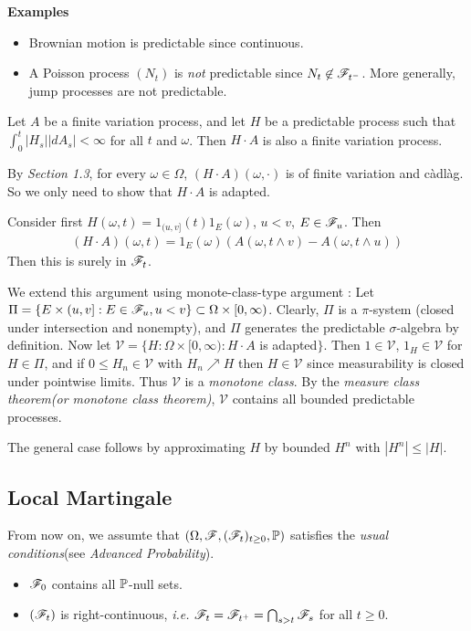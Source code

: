 \documentclass[12pt,a4paper]{article}
\newenvironment{proof}
{\begin{changemargin}{0.5cm}{0.5cm} 
	}%
	{\end{changemargin}
}
\renewenvironment{i}
{\begin{itemize} 
	}%
	{\end{itemize}
}
\newenvironment{p}
{\begin{proof} 
	}%
	{\end{proof}
}
\begin{document}
\textbf{Examples} \begin{i}
\item Brownian motion is predictable since continuous.
\item A Poisson process $(N_t)$ is \emph{not} predictable since $N_t \not\in \mathscr{F}_{t^-}$. More generally, jump processes are not predictable.
\end{i}
\s

\prop Let $A$ be a finite variation process, and let $H$ be a predictable process such that $\int_0^t |H_s| |dA_s| < \infty$ for all $t$ and $\omega$. Then $H\cdot A$ is also a finite variation process.
\begin{p}
\pf By \textit{Section 1.3}, for every $\omega \in \Omega$, $(H\cdot A)(\omega, \cdot)$ is of finite variation and c\`adl\`ag. So we only need to show that $H\cdot A$ is adapted.

\quad Consider first $H(\omega, t) = 1_{(u,v]}(t) 1_E(\omega)$, $u< v$, $E\in \mathscr{F}_u$. Then
\begin{align*}
(H\cdot A)(\omega, t) = 1_E(\omega)(A(\omega, t\wedge v) - A(\omega, t\wedge u))
\end{align*}
Then this is surely in $\mathscr{F}_t$.

\quad We extend this argument using monote-class-type argument : Let $\Pi = \{ E\times(u,v] : E\in \mathscr{F}_u, u<v\} \subset \Omega \times [0, \infty)$. Clearly, $\Pi$ is a $\pi$-system (closed under intersection and nonempty), and $\Pi$ generates the predictable $\sigma$-algebra by definition. Now let $\mathscr{V} = \{ H : \Omega \times[0, \infty) : H\cdot A$ is adapted$\}$. Then $1\in \mathscr{V}$, $1_H \in \mathscr{V}$ for $H \in \Pi$, and if $0\leq H_n \in \mathscr{V}$ with $H_n \nearrow H$ then $H\in \mathscr{V}$ since measurability is closed under pointwise limits. Thus $\mathscr{V}$ is a \emph{monotone class}. By the \emph{measure class theorem(or monotone class theorem)}, $\mathscr{V}$ contains all bounded predictable processes.

\quad The general case follows by approximating $H$ by bounded $H^n$ with $|H^n|\leq |H|$. 

\eop
\end{p}

\subsection{Local Martingale}

From now on, we assumte that $(\Omega, \mathscr{F}, (\mathscr{F}_t)_{t\geq 0}, \mathbb{P})$ satisfies the \emph{usual conditions}(see \emph{Advanced Probability}).
\begin{i}
\item $\mathscr{F}_0$ contains all $\mathbb{P}$-null sets. 
\item $(\mathscr{F}_t)$ is right-continuous, \textit{i.e.} $\mathscr{F}_t =\mathscr{F}_{t^+} = \bigcap_{s>t} \mathscr{F}_s$ for all $t\geq 0$.
\end{i}
\s
\end{document}
